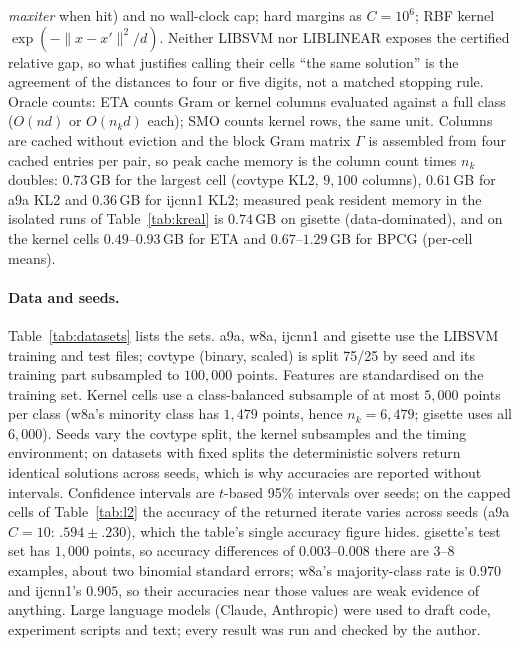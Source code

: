 \documentclass[pdflatex,sn-apa]{sn-jnl}%
\theoremstyle{thmstyleone}
\theoremstyle{thmstyletwo}
\newcommand{\norm}[1]{\lVert #1 \rVert}
\begin{document}
\emph{maxiter} when hit) and no wall-clock cap; hard margins as
$C=10^6$; RBF kernel $\exp(-\norm{x-x'}^2/d)$. Neither LIBSVM nor
LIBLINEAR exposes the certified relative gap, so what justifies calling
their cells ``the same solution'' is the agreement of the distances to
four or five digits, not a matched stopping rule. Oracle counts: ETA counts
Gram or kernel columns evaluated against a full class ($O(nd)$ or
$O(n_kd)$ each); SMO counts kernel rows, the same unit. Columns are
cached without eviction and the block Gram matrix $\Gamma$ is
assembled from four cached entries per pair, so peak cache memory is
the column count times $n_k$ doubles: $0.73$\,GB for the largest cell
(covtype KL2, $9{,}100$ columns), $0.61$\,GB for a9a KL2 and
$0.36$\,GB for ijcnn1 KL2; measured peak resident memory in the
isolated runs of Table~\ref{tab:kreal} is $0.74$\,GB on gisette
(data-dominated), and on the kernel cells $0.49$--$0.93$\,GB for ETA and
$0.67$--$1.29$\,GB for BPCG (per-cell means).

\paragraph{Data and seeds.} Table~\ref{tab:datasets} lists the sets.
a9a, w8a, ijcnn1 and gisette use the LIBSVM
training and test files; covtype (binary, scaled) is split 75/25 by
seed and its training part subsampled to $100{,}000$ points. Features are standardised
on the training set. Kernel cells use a class-balanced subsample of at
most $5{,}000$ points per class (w8a's minority class has $1{,}479$
points, hence $n_k=6{,}479$; gisette uses all $6{,}000$). Seeds vary
the covtype split, the kernel subsamples and the timing environment; on
datasets with fixed splits the deterministic solvers return identical
solutions across seeds, which is why accuracies are reported without
intervals.
Confidence intervals are $t$-based 95\% intervals over seeds; on the
capped cells of Table~\ref{tab:l2} the accuracy of the returned
iterate varies across seeds (a9a $C{=}10$: $.594\pm.230$), which the
table's single accuracy figure hides. gisette's test set has $1{,}000$
points, so accuracy differences of $0.003$--$0.008$ there are $3$--$8$
examples, about two binomial standard errors; w8a's majority-class
rate is $0.970$ and ijcnn1's $0.905$, so their accuracies near those
values are weak evidence of anything. Large language models (Claude,
Anthropic) were used to draft code, experiment scripts and text; every
result was run and checked by the author.



\end{document}
